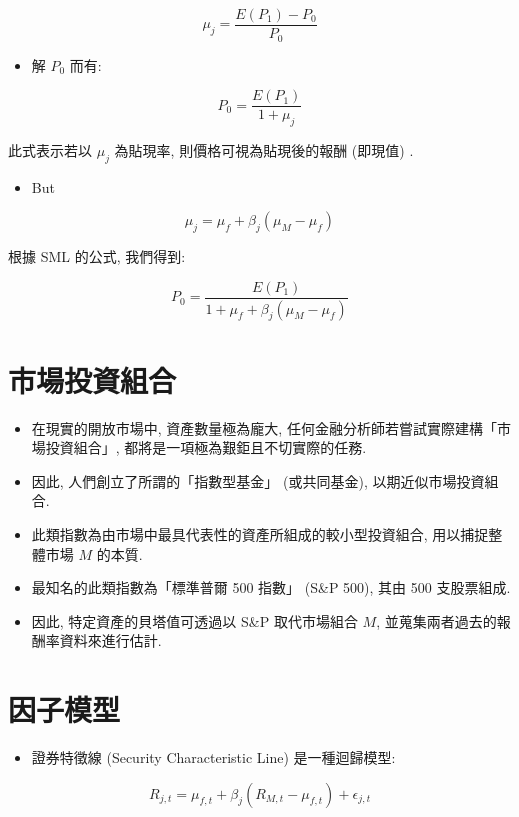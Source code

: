\documentclass[letterpaper]{article}
\begin{document}
		
		$$
		\mu_{j}=\frac{E\left (P_{1}\right) -P_{0}}{P_{0}}
		$$
		
		\begin{itemize}
			\item  解 $P_{0}$ 而有: 
		\end{itemize}
		
		$$
		P_{0}=\frac{E\left (P_{1}\right) }{1+\mu_{j}}
		$$
		
		此式表示若以 $\mu_{j}$ 為貼現率, 則價格可視為貼現後的報酬 (即現值) . 
		
		
		\begin{itemize}
			\item But
		\end{itemize}
		
		$$
		\mu_{j}=\mu_{f}+\beta_{j}\left (\mu_{M}-\mu_{f}\right) 
		$$
		
		根據 SML 的公式, 我們得到: 
		
		$$
		P_{0}=\frac{E\left (P_{1}\right) }{1+\mu_{f}+\beta_{j}\left (\mu_{M}-\mu_{f}\right) }
		$$
		
		\section*{市場投資組合}
		\begin{itemize}
			\item 在現實的開放市場中, 資產數量極為龐大, 任何金融分析師若嘗試實際建構「市場投資組合」, 都將是一項極為艱鉅且不切實際的任務. 
			\item 因此, 人們創立了所謂的「指數型基金」 (或共同基金), 以期近似市場投資組合. 
			\item 此類指數為由市場中最具代表性的資產所組成的較小型投資組合, 用以捕捉整體市場 $M$ 的本質. 
			\item 最知名的此類指數為「標準普爾 500 指數」 (S\&P 500), 其由 500 支股票組成. 
			\item 因此, 特定資產的貝塔值可透過以 S\&P 取代市場組合 $M$, 並蒐集兩者過去的報酬率資料來進行估計. 
		\end{itemize}
		
		\section*{因子模型}
		\begin{itemize}
			\item 證券特徵線 (Security Characteristic Line) 是一種迴歸模型: 
		\end{itemize}
		
		
		$$
		R_{j, t}=\mu_{f, t}+\beta_{j}\left (R_{M, t}-\mu_{f, t}\right) +\epsilon_{j, t}
		$$
		
\end{document}
